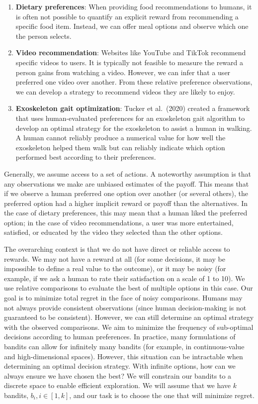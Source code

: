 \documentclass[
  letterpaper,
  numbers=noenddot,
  DIV=11]{scrreprt}
\theoremstyle{definition}
\theoremstyle{plain}
\theoremstyle{plain}
\theoremstyle{remark}
\begin{document}
\begin{enumerate}
\def\labelenumi{\arabic{enumi}.}
\item
  \textbf{Dietary preferences}: When providing food recommendations to
  humans, it is often not possible to quantify an explicit reward from
  recommending a specific food item. Instead, we can offer meal options
  and observe which one the person selects.
\item
  \textbf{Video recommendation}: Websites like YouTube and TikTok
  recommend specific videos to users. It is typically not feasible to
  measure the reward a person gains from watching a video. However, we
  can infer that a user preferred one video over another. From these
  relative preference observations, we can develop a strategy to
  recommend videos they are likely to enjoy.
\item
  \textbf{Exoskeleton gait optimization}: Tucker et al.~(2020) created a
  framework that uses human-evaluated preferences for an exoskeleton
  gait algorithm to develop an optimal strategy for the exoskeleton to
  assist a human in walking. A human cannot reliably produce a numerical
  value for how well the exoskeleton helped them walk but can reliably
  indicate which option performed best according to their preferences.
\end{enumerate}

Generally, we assume access to a set of actions. A noteworthy assumption
is that any observations we make are unbiased estimates of the payoff.
This means that if we observe a human preferred one option over another
(or several others), the preferred option had a higher implicit reward
or payoff than the alternatives. In the case of dietary preferences,
this may mean that a human liked the preferred option; in the case of
video recommendations, a user was more entertained, satisfied, or
educated by the video they selected than the other options.

The overarching context is that we do not have direct or reliable access
to rewards. We may not have a reward at all (for some decisions, it may
be impossible to define a real value to the outcome), or it may be noisy
(for example, if we ask a human to rate their satisfaction on a scale of
1 to 10). We use relative comparisons to evaluate the best of multiple
options in this case. Our goal is to minimize total regret in the face
of noisy comparisons. Humans may not always provide consistent
observations (since human decision-making is not guaranteed to be
consistent). However, we can still determine an optimal strategy with
the observed comparisons. We aim to minimize the frequency of
sub-optimal decisions according to human preferences. In practice, many
formulations of bandits can allow for infinitely many bandits (for
example, in continuous-value and high-dimensional spaces). However, this
situation can be intractable when determining an optimal decision
strategy. With infinite options, how can we always ensure we have chosen
the best? We will constrain our bandits to a discrete space to enable
efficient exploration. We will assume that we have \(k\) bandits,
\(b_i, i \in [1, k]\), and our task is to choose the one that will
minimize regret.
\end{document}
